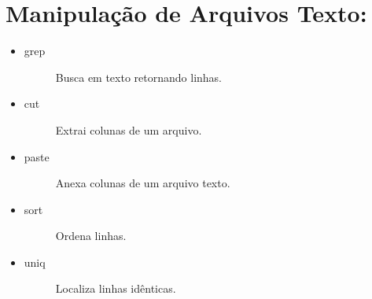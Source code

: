 \documentclass[a4paper,10pt,brazil]{sphinxmanual}
\begin{document}
\section{Manipulação de Arquivos Texto:}
\label{unix:manipulacao-de-arquivos-texto}\begin{itemize}
\item {} \begin{description}
\item[{grep}] \leavevmode
Busca em texto retornando linhas.

\end{description}

\item {} \begin{description}
\item[{cut}] \leavevmode
Extrai colunas de um arquivo.

\end{description}

\item {} \begin{description}
\item[{paste}] \leavevmode
Anexa colunas de um arquivo texto.

\end{description}

\item {} \begin{description}
\item[{sort}] \leavevmode
Ordena linhas.

\end{description}

\item {} \begin{description}
\item[{uniq}] \leavevmode
Localiza linhas idênticas.

\end{description}

\end{itemize}
\end{document}
